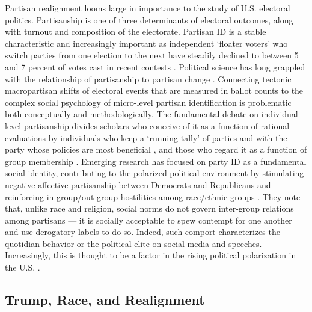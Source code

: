Partisan realignment looms large in importance to the study of U.S. electoral politics. Partisanship is one of three determinants of electoral outcomes, along with turnout and composition of the electorate. Partisan ID is a stable characteristic and increasingly important as independent `floater voters' who switch parties from one election to the next have steadily declined to between 5 and 7 percent of votes cast in recent contests \citep{smidt_polarization_2017}. Political science has long grappled with the relationship of partisanship to partisan change \citep{green_how_1994, jackson_connecting_2011}. Connecting tectonic macropartisan shifts of electoral events that are measured in ballot counts to the complex social psychology of micro-level partisan identification is problematic both conceptually and methodologically.  The fundamental debate on individual-level partisanship divides scholars who conceive of it as a function of rational evaluations by individuals who keep a `running tally' of parties and with the party whose policies are most beneficial \citep{downs_economic_1957, fiorina_retrospective_1981}, and those who regard it as a function of group membership \citep{campbell_american_1960, green_partisan_2008}. Emerging research has focused on party ID as a fundamental social identity, contributing to the polarized political environment by stimulating negative affective partisanship between Democrats and Republicans and reinforcing in-group/out-group hostilities among race/ethnic groups \citep{iyengar_origins_2019}. They note that, unlike race and religion, social norms do not govern inter-group relations among partisans --- it is socially acceptable to spew contempt for one another and use derogatory labels to do so. Indeed, such comport characterizes the quotidian behavior or the political elite on social media and speeches. Increasingly, this is thought to be a factor in the rising political polarization in the U.S. \citep{west_partisanship_2020, abramowitz_united_2019}. 


\subsection{Trump, Race, and Realignment}

